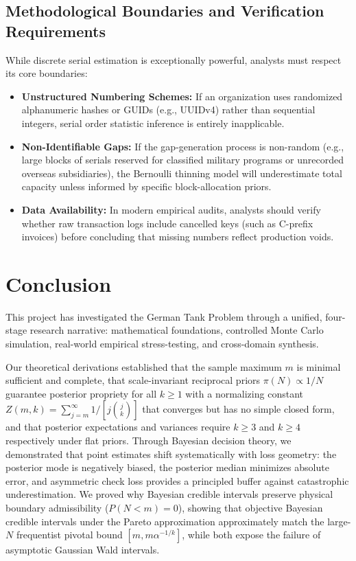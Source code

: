 \documentclass[10pt,a4paper]{article}
\begin{document}
\subsection{Methodological Boundaries and Verification Requirements}
While discrete serial estimation is exceptionally powerful, analysts must respect its core boundaries:
\begin{itemize}
    \item \textbf{Unstructured Numbering Schemes:} If an organization uses randomized alphanumeric hashes or GUIDs (e.g., UUIDv4) rather than sequential integers, serial order statistic inference is entirely inapplicable.
    \item \textbf{Non-Identifiable Gaps:} If the gap-generation process is non-random (e.g., large blocks of serials reserved for classified military programs or unrecorded overseas subsidiaries), the Bernoulli thinning model will underestimate total capacity unless informed by specific block-allocation priors.
    \item \textbf{Data Availability:} In modern empirical audits, analysts should verify whether raw transaction logs include cancelled keys (such as C-prefix invoices) before concluding that missing numbers reflect production voids.
\end{itemize}

\section{Conclusion}

This project has investigated the German Tank Problem through a unified, four-stage research narrative: mathematical foundations, controlled Monte Carlo simulation, real-world empirical stress-testing, and cross-domain synthesis.

Our theoretical derivations established that the sample maximum $m$ is minimal sufficient and complete, that scale-invariant reciprocal priors $\pi(N) \propto 1/N$ guarantee posterior propriety for all $k \ge 1$ with a normalizing constant $Z(m,k)=\sum_{j=m}^{\infty}1/[j\binom{j}{k}]$ that converges but has no simple closed form, and that posterior expectations and variances require $k \ge 3$ and $k \ge 4$ respectively under flat priors. Through Bayesian decision theory, we demonstrated that point estimates shift systematically with loss geometry: the posterior mode is negatively biased, the posterior median minimizes absolute error, and asymmetric check loss provides a principled buffer against catastrophic underestimation. We proved why Bayesian credible intervals preserve physical boundary admissibility ($P(N < m) = 0$), showing that objective Bayesian credible intervals under the Pareto approximation approximately match the large-$N$ frequentist pivotal bound $[m, m\alpha^{-1/k}]$, while both expose the failure of asymptotic Gaussian Wald intervals.
\end{document}
